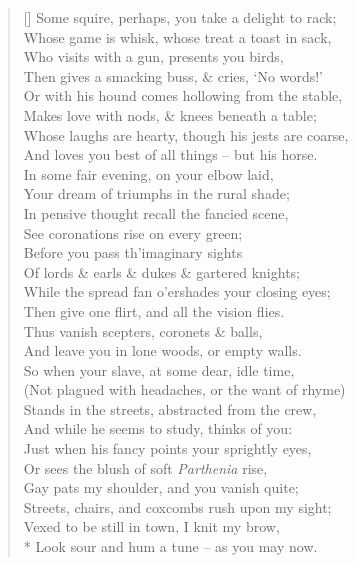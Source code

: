 \documentclass[MAIN]{subfiles}
\begin{document}
\begin{verse}[\versewidth]
Some squire, perhaps, you take a delight to rack;\\
Whose game is whisk, whose treat a toast in sack,\\
Who visits with a gun, presents you birds,\\
Then gives a smacking buss, \& cries, `No words!'\\
Or with his hound comes hollowing from the stable,\\
Makes love with nods, \& knees beneath a table;\\
Whose laughs are hearty, though his jests are coarse,\\
And loves you best of all things -- but his horse.\\
In some fair evening, on your elbow laid,\\
Your dream of triumphs in the rural shade;\\
In pensive thought recall the fancied scene,\\
See coronations rise on every green;\\
Before you pass th'imaginary sights\\
Of lords \& earls \& dukes \& gartered knights;\\
While the spread fan o'ershades your closing eyes;\\
Then give one flirt, and all the vision flies.\\
Thus vanish scepters, coronets \& balls,\\
And leave you in lone woods, or empty walls.\\
So when your slave, at some dear, idle time,\\
(Not plagued with headaches, or the want of rhyme)\\
Stands in the streets, abstracted from the crew,\\
And while he seems to study, thinks of you:\\
Just when his fancy points your sprightly eyes,\\
Or sees the blush of soft \emph{Parthenia} rise,\\
Gay pats my shoulder, and you vanish quite;\\
Streets, chairs, and coxcombs rush upon my sight;\\
Vexed to be still in town, I knit my brow,\\*
Look sour and hum a tune -- as you may now.
\end{verse}
\end{document}
